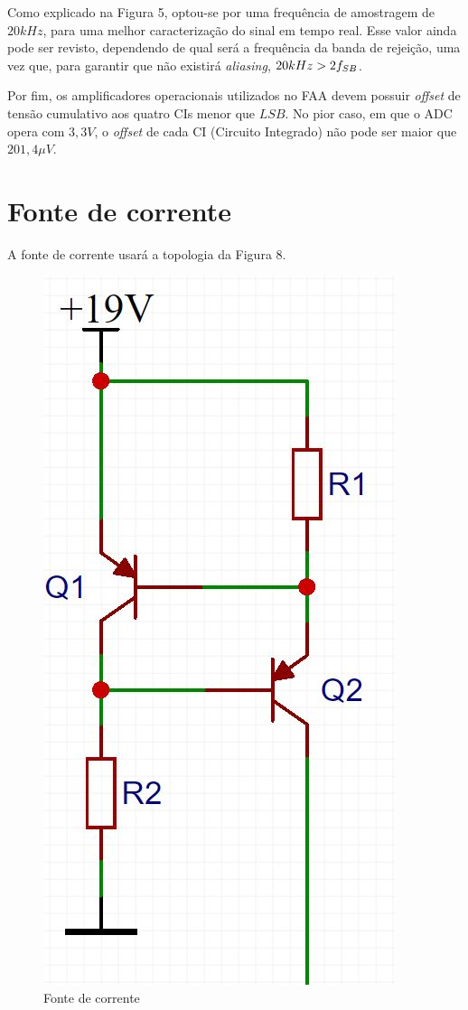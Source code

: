 \documentclass[11pt]{abntex2}
\begin{document}
				Como explicado na Figura 5, optou-se por uma frequência de
				amostragem de $20kHz$, para uma melhor caracterização do sinal
				em tempo real. Esse valor ainda pode ser revisto, dependendo de
				qual será a frequência da banda de rejeição, uma vez que, para
				garantir que não existirá \textit{aliasing}, $20kHz > 2\*f_{SB}$.

				Por fim, os amplificadores operacionais utilizados no FAA devem
				possuir \textit{offset} de tensão cumulativo aos quatro CIs
				menor que $LSB$. No pior caso, em que o ADC opera com $3,3V$,
				o \textit{offset} de cada CI (Circuito Integrado) não pode ser
				maior que $201,4\mu V$.

		\section{Fonte de corrente}

			A fonte de corrente usará a topologia da Figura 8.

			\begin{figure}[!ht]
				\centering
				\includegraphics[scale = 0.3]{../Fotos/fonteCorrenteClean2.jpg}
				\caption{Fonte de corrente}
			\end{figure}
\end{document}
